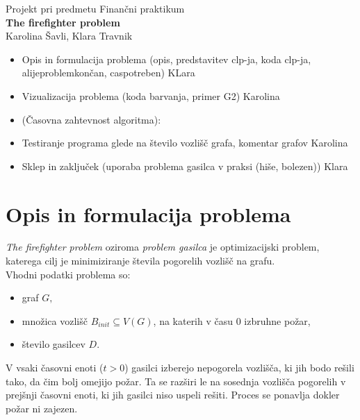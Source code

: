 \documentclass[a4paper, 12pt]{article}
\begin{document}
    
\thispagestyle{empty}
\vfill

\begin{center}{\large
Projekt pri predmetu Finančni praktikum\\[5mm]
{\Huge \bf The firefighter problem}\\[5mm]
Karolina Šavli, Klara Travnik\\[1cm]}
\end{center}
\vfill

\pagebreak


\tableofcontents

\pagebreak



\begin{itemize}
    \item Opis in formulacija problema (opis, predstavitev clp-ja, koda clp-ja, alijeproblemkončan, caspotreben) KLara
    \item Vizualizacija problema (koda barvanja, primer G2) Karolina
    \item (Časovna zahtevnost algoritma): 
    \item Testiranje programa glede na število vozlišč grafa, komentar grafov Karolina
    \item Sklep in zaključek (uporaba problema gasilca v praksi (hiše, bolezen)) Klara
\end{itemize}


\pagebreak

\section{Opis in formulacija problema}

\noindent \emph{The firefighter problem} oziroma \emph{problem gasilca} je optimizacijski problem, katerega cilj je 
minimiziranje števila pogorelih vozlišč na grafu. \\
Vhodni podatki problema so:
\begin{itemize}
    \item graf $G,$
    \item množica vozlišč $B_{init} \subseteq V\left(G\right)$, na katerih v času $0$ izbruhne požar,
    \item število gasilcev $D$.
\end{itemize} 
V vsaki časovni enoti ($t > 0$) gasilci izberejo nepogorela vozlišča, ki jih bodo rešili tako,
da čim bolj omejijo požar. Ta se razširi le na sosednja vozlišča pogorelih v prejšnji časovni enoti,
ki jih gasilci niso uspeli rešiti. Proces se ponavlja dokler požar ni zajezen.
\end{document}
